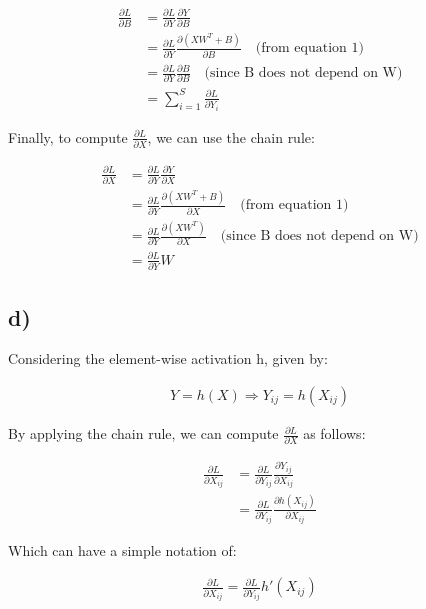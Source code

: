 \documentclass{article}
\begin{document}
\begin{align*}
    \frac{\partial L}{\partial B} &= \frac{\partial L}{\partial Y} \frac{\partial Y}{\partial B} \\
    &= \frac{\partial L}{\partial Y} \frac{\partial (XW^T + B)}{\partial B} \quad \text{(from equation 1)} \\
    &= \frac{\partial L}{\partial Y} \frac{\partial B}{\partial B} \quad \text{(since B does not depend on W)} \\
    &= \sum_{i=1}^{S} \frac{\partial L}{\partial Y_i}
\end{align*}

Finally, to compute $\frac{\partial L}{\partial X}$, we can use the chain rule:

\begin{align*}
    \frac{\partial L}{\partial X} &= \frac{\partial L}{\partial Y} \frac{\partial Y}{\partial X} \\
    &= \frac{\partial L}{\partial Y} \frac{\partial (XW^T + B)}{\partial X} \quad \text{(from equation 1)} \\
    &= \frac{\partial L}{\partial Y} \frac{\partial (XW^T)}{\partial X} \quad \text{(since B does not depend on W)} \\
    &= \frac{\partial L}{\partial Y} W
\end{align*}

\subsection*{d)}

Considering the element-wise activation h, given by: 

\begin{align*}
    Y = h(X) \Rightarrow  Y_{ij} = h(X_{ij})
\end{align*}

By applying the chain rule, we can compute $\frac{\partial L}{\partial X}$ as follows:

\begin{align*}
    \frac{\partial L}{\partial X_{ij}} &= \frac{\partial L}{\partial Y_{ij}} \frac{\partial Y_{ij}}{\partial X_{ij}} \\
    &= \frac{\partial L}{\partial Y_{ij}} \frac{\partial h(X_{ij})}{\partial X_{ij}}
\end{align*}

Which can have a simple notation of:

\begin{align*}
    \frac{\partial L}{\partial X_{ij}} = \frac{\partial L}{\partial Y_{ij}} h'(X_{ij})
\end{align*}
\end{document}
